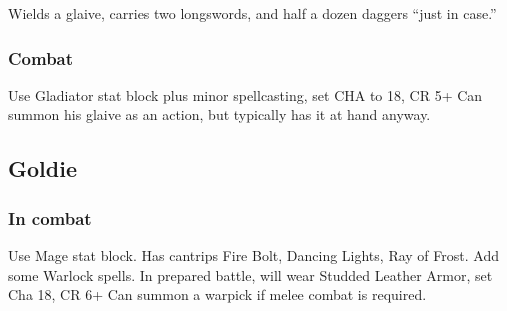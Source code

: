 Wields a glaive, carries two longswords, and half a dozen daggers ``just in case.''

\subsubsection{Combat}
Use Gladiator stat block plus minor spellcasting, set CHA to 18, CR 5+
Can summon his glaive as an action, but typically has it at hand anyway.

\subsection{Goldie}\label{subsec:goldie}

\subsubsection{In combat}

Use Mage stat block.
Has cantrips Fire Bolt, Dancing Lights, Ray of Frost.
Add some Warlock spells.
In prepared battle, will wear Studded Leather Armor, set Cha 18, CR 6+
Can summon a warpick if melee combat is required.
